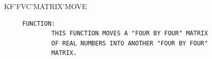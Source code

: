 \begin{frame}
KF'FVC'MATRIX'MOVE
\begin{verbatim}
     FUNCTION:
             THIS FUNCTION MOVES A "FOUR BY FOUR" MATRIX
             OF REAL NUMBERS INTO ANOTHER "FOUR BY FOUR"
             MATRIX.

\end{verbatim}
\end{frame}

